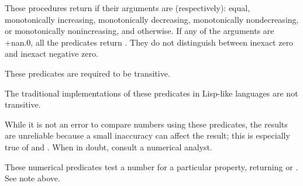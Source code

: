 \begin{entry}{%
}

These procedures return \schtrue{} if their arguments are (respectively):
equal, monotonically increasing, monotonically decreasing,
monotonically nondecreasing, or monotonically nonincreasing,
and \schfalse{} otherwise.
If any of the arguments are +nan.0, all the predicates return \schfalse{}.
They do not distinguish between inexact zero and inexact negative zero.

These predicates are required to be transitive.

\begin{note}
The traditional implementations of these predicates in Lisp-like
languages are not transitive.
\end{note}

\begin{note}
While it is not an error to compare  numbers using these
predicates, the results are unreliable because a small inaccuracy
can affect the result; this is especially true of \ide{=} and .
When in doubt, consult a numerical analyst.
\end{note}

\end{entry}

\begin{entry}{%
}

These numerical predicates test a number for a particular property,
returning \schtrue{} or \schfalse.  See note above.

\end{entry}

